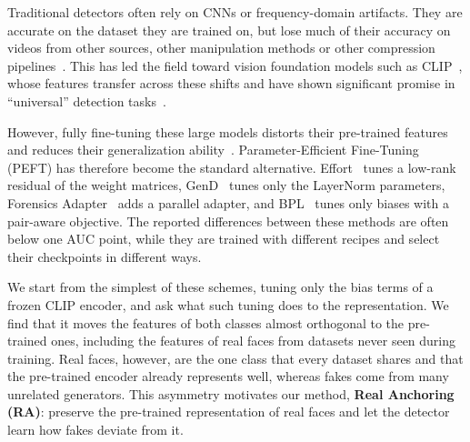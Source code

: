 \documentclass[fonts]{icst}
\begin{document}
Traditional detectors often rely on CNNs or frequency-domain artifacts. They are accurate on the dataset they are trained on, but lose much of their accuracy on videos from other sources, other manipulation methods or other compression pipelines~\cite{yan2023deepfakebench}.
This has led the field toward vision foundation models such as CLIP~\cite{radford2021clip_vitl}, whose features transfer across these shifts and have shown significant promise in ``universal'' detection tasks~\cite{ojha2023universal}.

However, fully fine-tuning these large models distorts their pre-trained features and reduces their generalization ability~\cite{kumar2022finetuning}.
Parameter-Efficient Fine-Tuning (PEFT) has therefore become the standard alternative. Effort~\cite{yan2025effort} tunes a low-rank residual of the weight matrices, GenD~\cite{yermakov2025gend} tunes only the LayerNorm parameters, Forensics Adapter~\cite{cui2025forada} adds a parallel adapter, and BPL~\cite{xu2026bpl} tunes only biases with a pair-aware objective. The reported differences between these methods are often below one AUC point, while they are trained with different recipes and select their checkpoints in different ways.

We start from the simplest of these schemes, tuning only the bias terms of a frozen CLIP encoder, and ask what such tuning does to the representation. We find that it moves the features of both classes almost orthogonal to the pre-trained ones, including the features of real faces from datasets never seen during training. Real faces, however, are the one class that every dataset shares and that the pre-trained encoder already represents well, whereas fakes come from many unrelated generators. This asymmetry motivates our method, \textbf{Real Anchoring (RA)}: preserve the pre-trained representation of real faces and let the detector learn how fakes deviate from it.
\end{document}

